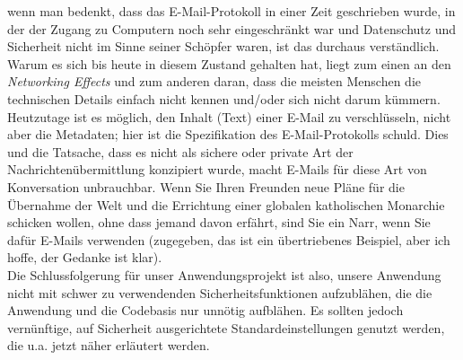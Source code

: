 \documentclass[a4paper,11pt]{article}
\begin{document}
wenn man bedenkt, dass das E-Mail-Protokoll in einer Zeit geschrieben wurde, in der der Zugang zu Computern noch sehr eingeschränkt war und Datenschutz und Sicherheit nicht im Sinne seiner Schöpfer waren, ist das durchaus verständlich. Warum es sich bis heute in diesem Zustand gehalten hat, liegt zum einen an den \textit{Networking Effects} und zum anderen daran, dass die meisten Menschen die technischen Details einfach nicht kennen und/oder sich nicht darum kümmern.\\


Heutzutage ist es möglich, den Inhalt (Text) einer E-Mail zu verschlüsseln, nicht aber die Metadaten; hier ist die Spezifikation des E-Mail-Protokolls schuld. Dies und die Tatsache, dass es nicht als sichere oder private Art der Nachrichtenübermittlung konzipiert wurde, macht E-Mails für diese Art von Konversation unbrauchbar. Wenn Sie Ihren Freunden neue Pläne für die Übernahme der Welt und die Errichtung einer globalen katholischen Monarchie schicken wollen, ohne dass jemand davon erfährt, sind Sie ein Narr, wenn Sie dafür E-Mails verwenden (zugegeben, das ist ein übertriebenes Beispiel, aber ich hoffe, der Gedanke ist klar).\\

Die Schlussfolgerung für unser Anwendungsprojekt ist also, unsere Anwendung nicht mit schwer zu verwendenden Sicherheitsfunktionen aufzublähen, die die Anwendung und die Codebasis nur unnötig aufblähen. Es sollten jedoch vernünftige, auf Sicherheit ausgerichtete Standardeinstellungen genutzt werden, die u.a. jetzt näher erläutert werden.
\end{document}

